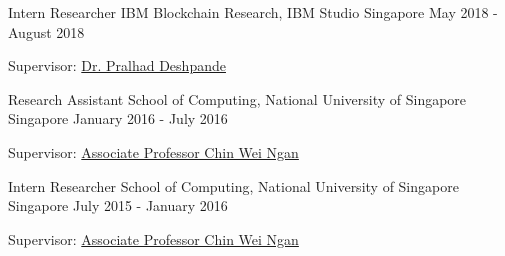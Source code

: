 

\begin{cventries}

  
  \cventry
    {Intern Researcher} %
    {IBM Blockchain Research, IBM Studio} %
    {Singapore} %
    {May 2018 - August 2018} %
    {
      \begin{cvitems} %
        \item {Supervisor: \href{https://www.linkedin.com/in/pralhad-deshpande-97688010/}{Dr. Pralhad Deshpande}}
      \end{cvitems}
    }



  \cventry
    {Research Assistant} %
    {School of Computing, National University of Singapore} %
    {Singapore} %
    {January 2016 - July 2016} %
    {
      \begin{cvitems} %
        \item {Supervisor: \href{https://www.comp.nus.edu.sg/~chinwn/}{Associate Professor Chin Wei Ngan}}
      \end{cvitems}
    }



  \cventry
    {Intern Researcher} %
    {School of Computing, National University of Singapore} %
    {Singapore} %
    {July 2015 - January 2016} %
    {
      \begin{cvitems} %
        \item {Supervisor: \href{https://www.comp.nus.edu.sg/~chinwn/}{Associate Professor Chin Wei Ngan}}
      \end{cvitems}
    }


\end{cventries}
